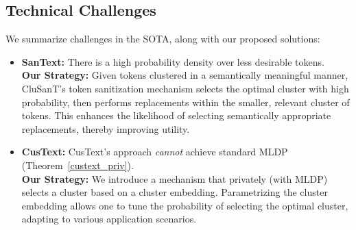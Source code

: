 \documentclass[11pt]{article}
\newcommand{\clusant}{CluSanT\xspace}
\begin{document}
\subsection{Technical Challenges}
We summarize challenges in the SOTA,  along with our proposed solutions:

\begin{itemize}
\setlength\itemsep{0em}
    \item \textbf{SanText:} %
    There is a high probability density over less desirable tokens. \\
    \textbf{Our Strategy:} Given tokens clustered in a semantically meaningful manner, \clusant's token sanitization mechanism selects the optimal cluster with high probability, then performs replacements within the smaller, relevant cluster of tokens. This enhances the likelihood of selecting semantically appropriate replacements, thereby improving utility.

    \item \textbf{CusText:} 
    CusText's approach {\em cannot} achieve standard MLDP (Theorem~\ref{custext_priv}). \\
    \textbf{Our Strategy:} 
    We introduce a mechanism that privately (with MLDP) selects a cluster based on a cluster embedding. Parametrizing the cluster embedding allows one to tune the probability of selecting the optimal cluster, adapting to various application scenarios.
    

\end{itemize}
\end{document}
